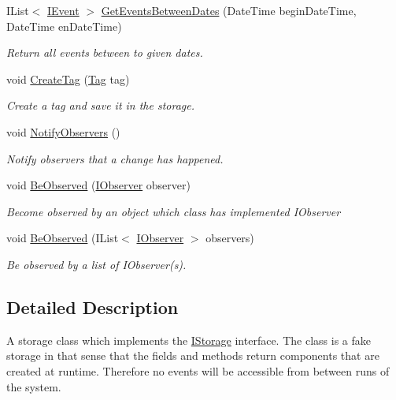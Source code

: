 \begin{DoxyCompactItemize}
I\+List$<$ \hyperlink{interface_calendar_system_1_1_model_1_1_i_event}{I\+Event} $>$ \hyperlink{class_calendar_system_1_1_data_storage_1_1_fake_storage_a16ce769932055ee3cc1bd47e945e7cfe}{Get\+Events\+Between\+Dates} (Date\+Time begin\+Date\+Time, Date\+Time en\+Date\+Time)
\begin{DoxyCompactList}\small\item\em Return all events between to given dates. \end{DoxyCompactList}\item 
void \hyperlink{class_calendar_system_1_1_data_storage_1_1_fake_storage_a713df02585d277ddb922d5912ad4a592}{Create\+Tag} (\hyperlink{class_calendar_system_1_1_model_1_1_tag}{Tag} tag)
\begin{DoxyCompactList}\small\item\em Create a tag and save it in the storage. \end{DoxyCompactList}\item 
void \hyperlink{class_calendar_system_1_1_data_storage_1_1_fake_storage_ad141dac914a11365efa50b8bf1bcc80d}{Notify\+Observers} ()
\begin{DoxyCompactList}\small\item\em Notify observers that a change has happened. \end{DoxyCompactList}\item 
void \hyperlink{class_calendar_system_1_1_data_storage_1_1_fake_storage_a145d71dfbca477a39bbd5c865f2e10fe}{Be\+Observed} (\hyperlink{interface_calendar_system_1_1_model_1_1_i_observer}{I\+Observer} observer)
\begin{DoxyCompactList}\small\item\em Become observed by an object which class has implemented I\+Observer \end{DoxyCompactList}\item 
void \hyperlink{class_calendar_system_1_1_data_storage_1_1_fake_storage_ab9861bbbb0b5f5af8928f4c7efec59b5}{Be\+Observed} (I\+List$<$ \hyperlink{interface_calendar_system_1_1_model_1_1_i_observer}{I\+Observer} $>$ observers)
\begin{DoxyCompactList}\small\item\em Be observed by a list of I\+Observer(s). \end{DoxyCompactList}\end{DoxyCompactItemize}


\subsection{Detailed Description}
A storage class which implements the \hyperlink{interface_calendar_system_1_1_data_storage_1_1_i_storage}{I\+Storage} interface. The class is a fake storage in that sense that the fields and methods return components that are created at runtime. Therefore no events will be accessible from between runs of the system. 



